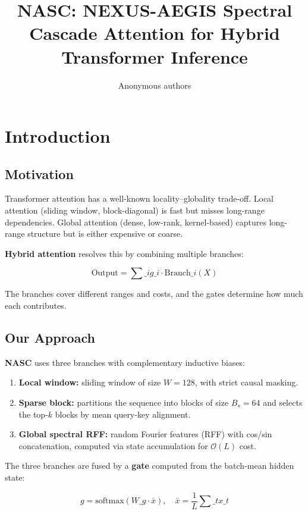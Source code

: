 \title{\textbf{NASC: NEXUS-AEGIS Spectral Cascade Attention for Hybrid Transformer Inference}}

\author{Anonymous authors}



\section{Introduction}

\subsection{Motivation}

Transformer attention has a well-known locality--globality trade-off. 
Local attention (sliding window, block-diagonal) is fast but misses 
long-range dependencies. Global attention (dense, low-rank, kernel-based) 
captures long-range structure but is either expensive or coarse.

\textbf{Hybrid attention} resolves this by combining multiple branches:

\[
\text{Output} = \sum\_{i} g\_i \cdot \text{Branch}\_i(X)
\tag{1.1}
\]

The branches cover different ranges and costs, and the gates determine 
how much each contributes.

\subsection{Our Approach}

\textbf{NASC} uses three branches with complementary inductive biases:

\begin{enumerate}
\item \textbf{Local window:} sliding window of size $W = 128$, with
  strict causal masking.
\item \textbf{Sparse block:} partitions the sequence into blocks of size
  $B_s = 64$ and selects the top-$k$ blocks by mean
  query-key alignment.
\item \textbf{Global spectral RFF:} random Fourier features (RFF) with cos/sin
  concatenation, computed via state accumulation for $\mathcal{O}(L)$
  cost.

\end{enumerate}
The three branches are fused by a \textbf{gate} computed from the batch-mean 
hidden state:

\[
g = \text{softmax}(W\_g \cdot \bar{x}), \quad \bar{x} = \frac{1}{L} \sum\_t x\_t
\tag{1.2}
\]

